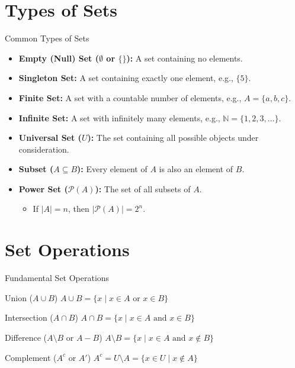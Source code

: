 \documentclass{beamer}
\begin{document}
\section{Types of Sets}
\begin{frame}{Common Types of Sets}
    \begin{itemize}
        \item \textbf{Empty (Null) Set ($\emptyset$ or $\{\}$):} A set containing no elements.
        \item \textbf{Singleton Set:} A set containing exactly one element, e.g., $\{5\}$.
        \item \textbf{Finite Set:} A set with a countable number of elements, e.g., $A = \{a, b, c\}$.
        \item \textbf{Infinite Set:} A set with infinitely many elements, e.g., $\mathbb{N} = \{1, 2, 3, \dots\}$.
        \item \textbf{Universal Set ($U$):} The set containing all possible objects under consideration.
        \item \textbf{Subset ($A \subseteq B$):} Every element of $A$ is also an element of $B$.
        \item \textbf{Power Set ($\mathcal{P}(A)$):} The set of all subsets of $A$.
        \begin{itemize}
            \item If $|A| = n$, then $|\mathcal{P}(A)| = 2^n$.
        \end{itemize}
    \end{itemize}
\end{frame}

\section{Set Operations}
\begin{frame}{Fundamental Set Operations}
    \begin{block}{Union ($A \cup B$)}
        $A \cup B = \{ x \mid x \in A \text{ or } x \in B \}$
    \end{block}

    \begin{block}{Intersection ($A \cap B$)}
        $A \cap B = \{ x \mid x \in A \text{ and } x \in B \}$
    \end{block}

    \begin{block}{Difference ($A \setminus B$ or $A - B$)}
        $A \setminus B = \{ x \mid x \in A \text{ and } x \notin B \}$
    \end{block}

    \begin{block}{Complement ($A^c$ or $A'$)}
        $A^c = U \setminus A = \{ x \in U \mid x \notin A \}$
    \end{block}
\end{frame}
\end{document}
